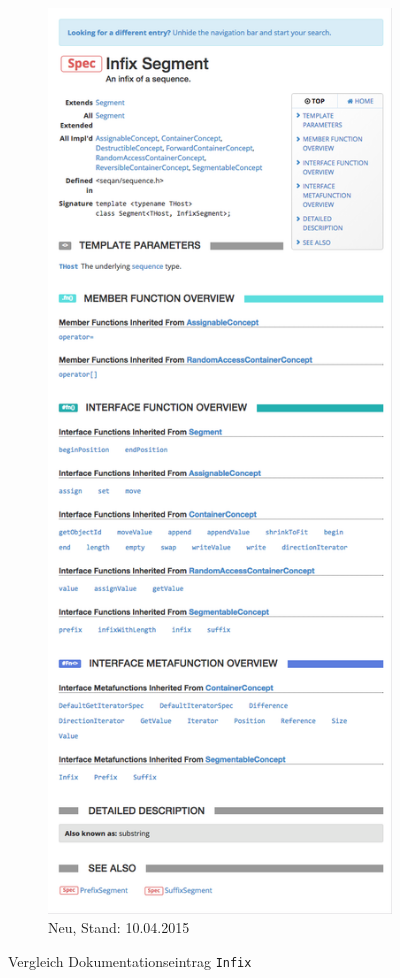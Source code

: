\begin{figure}
\begin{subfigure}{0.48\linewidth}
                \includegraphics[width=\linewidth]{Figures/dox/infix-new.png}
                \caption[Vergleich Dokumentationseintrag \texttt{Infix} - Neu]{Neu, Stand: 10.04.2015}
                \label{fig:dox-index-compare-new}
        \end{subfigure}%
        \caption{Vergleich Dokumentationseintrag \texttt{Infix}}%
\end{figure}



